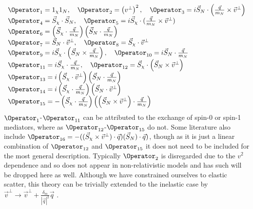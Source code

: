 \begin{equation}
\begin{array}{lcl}
\Operator_{1}=1_{\chi}1_N, \quad \Operator_{2}=\left(v^{\perp}\right)^{2}, \quad \Operator_{3}=i \vec{S}_{N} \cdot\left(\frac{\vec{q}}{m_N} \times \vec{v}^{\perp}\right) \\ 
\Operator_{4}=\vec{S}_{\chi} \cdot \vec{S}_{N}, \quad \Operator_{5}=i \vec{S}_{\chi} \cdot(\frac{\vec{q}}{m_N} \times \vec{v}^{\perp}) \\ 
\Operator_{6}=\left(\vec{S}_{\chi} \cdot \frac{\vec{q}}{m_N}\right)\left(\vec{S}_{N} \cdot \frac{\vec{q}}{m_N}\right) \\
\Operator_{7}=\vec{S}_{N} \cdot \vec{v}^{\perp}, \quad \Operator_{8}=\vec{S}_{\chi} \cdot \vec{v}^{\perp} \\
\Operator_{9}=i \vec{S}_{\chi} \cdot\left(\vec{S}_{N} \times \frac{\vec{q}}{m_N}\right), \quad \Operator_{10}=i \vec{S}_{N} \cdot \frac{\vec{q}}{m_N} \\ 
\Operator_{11}=i \vec{S}_{\chi} \cdot \frac{\vec{q}}{m_N}, \quad \Operator_{12} =\vec{S}_{\chi} \cdot\left(\vec{S}_{N} \times \vec{v}^{\perp}\right) \\
\Operator_{13} =i\left(\vec{S}_{\chi} \cdot \vec{v}^{\perp}\right)\left(\vec{S}_{N} \cdot \frac{\vec{q}}{m_N}\right) \\ 
\Operator_{14} =i\left(\vec{S}_{\chi} \cdot \frac{\vec{q}}{m_N}\right)\left(\vec{S}_{N} \cdot \vec{v}^{\perp}\right) \\ 
\Operator_{15} =-\left(\vec{S}_{\chi} \cdot \frac{\vec{q}}{m_N}\right)\left(\left(\vec{S}_{N} \times \vec{v}^{\perp}\right) \cdot \frac{\vec{q}}{m_N}\right)
\end{array}
\label{eq:EFT_Operators}
\end{equation}
$\Operator_{1}$-$\Operator_{11}$ can be attributed to the exchange of spin-0 or spin-1 mediators, where as $\Operator_{12}$-$\Operator_{15}$ do not.
Some literature also include $\Operator_{16}=-((\vec{S}_\chi \times \vec{v}^{\bot}) \cdot \vec{q})(\vec{S}_N) \cdot \vec{q})$, though as it is just a linear combination of $\Operator_{12}$ and $\Operator_{15}$ it does not need to be included for the most general description.
Typically $\Operator_{2}$ is disregarded due to the $v^{2}$ dependence and so does not appear in non-relativistic models and has such will be dropped here as well.
Although we have constrained ourselves to elastic scatter, this theory can be trivially extended to the inelastic case by $\vec{v}^{\perp} \rightarrow \vec{v}^{\perp} + \frac{\delta_m}{|\vec{q}|^2}\vec{q}$ \cite{inelastics_eft_ref}.
